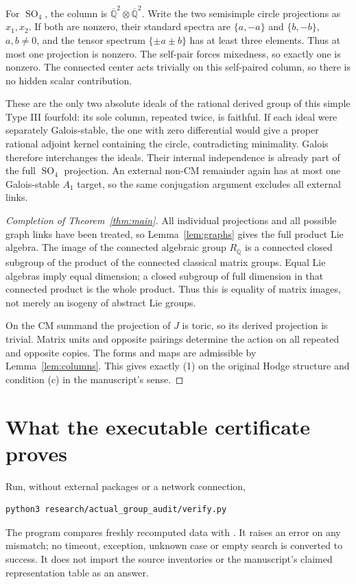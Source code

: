 \documentclass[11pt]{article}
\newcommand{\kk}{{\overline{\mathbb Q}}}
\DeclareMathOperator{\SO}{SO}
\theoremstyle{remark}
\begin{document}
For $\SO_4$, the column is $\kk^2\otimes\kk^2$.
Write the two semisimple circle projections as $x_1,x_2$.
If both are nonzero, their standard spectra are $\{a,-a\}$ and
$\{b,-b\}$, $a,b\ne0$, and the tensor spectrum
$\{\pm a\pm b\}$ has at least three elements. Thus at most one
projection is nonzero. The self-pair forces mixedness, so exactly
one is nonzero. The connected center acts trivially on this
self-paired column, so there is no hidden scalar contribution.

These are the only two absolute ideals of the rational derived
group of this simple Type III fourfold: its sole column, repeated
twice, is faithful. If each ideal were separately Galois-stable,
the one with zero differential would give a proper rational
adjoint kernel containing the circle, contradicting minimality.
Galois therefore interchanges the ideals. Their internal
independence is already part of the full $\SO_4$ projection.
An external non-CM remainder again has at most one Galois-stable
$A_1$ target, so the same conjugation argument excludes all
external links.

\begin{proof}[Completion of Theorem~\ref{thm:main}]
All individual projections and all possible graph links have
been treated, so Lemma~\ref{lem:graphs} gives the full product
Lie algebra. The image of the connected algebraic group $R_\kk$
is a connected closed subgroup of the product of the connected
classical matrix groups. Equal Lie algebras imply equal dimension;
a closed subgroup of full dimension in that connected product
is the whole product. Thus this is equality of matrix images,
not merely an isogeny of abstract Lie groups.

On the CM summand the projection of $J$ is toric, so its derived
projection is trivial. Matrix units and opposite pairings determine
the action on all repeated and opposite copies. The forms and maps
are admissible by Lemma~\ref{lem:columns}. This gives exactly
(1) on the original Hodge structure and condition (c) in the
manuscript's sense.
\end{proof}

\section{What the executable certificate proves}

Run, without external packages or a network connection,
\begin{verbatim}
python3 research/actual_group_audit/verify.py
\end{verbatim}
The program compares freshly recomputed data with
. It raises an error on
any mismatch; no timeout, exception, unknown case or empty search
is converted to success. It does not import the source inventories
or the manuscript's claimed representation table as an answer.
\end{document}
